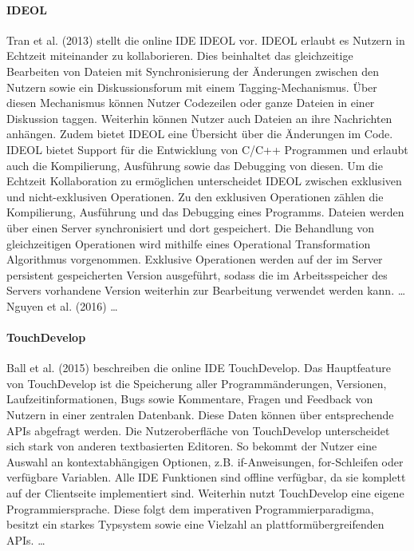 \paragraph{IDEOL}
Tran et al. (2013) \cite{tran_interactive_2013} stellt die online IDE IDEOL vor. IDEOL erlaubt es Nutzern in Echtzeit miteinander zu kollaborieren. Dies beinhaltet das gleichzeitige Bearbeiten von Dateien mit Synchronisierung der Änderungen zwischen den Nutzern sowie ein Diskussionsforum mit einem Tagging-Mechanismus. Über diesen Mechanismus können Nutzer Codezeilen oder ganze Dateien in einer Diskussion taggen. Weiterhin können Nutzer auch Dateien an ihre Nachrichten anhängen. Zudem bietet IDEOL eine Übersicht über die Änderungen im Code. IDEOL bietet Support für die Entwicklung von C/C++ Programmen und erlaubt auch die Kompilierung, Ausführung sowie das Debugging von diesen. Um die Echtzeit Kollaboration zu ermöglichen unterscheidet IDEOL zwischen exklusiven und nicht-exklusiven Operationen. Zu den exklusiven Operationen zählen die Kompilierung, Ausführung und das Debugging eines Programms. Dateien werden über einen Server synchronisiert und dort gespeichert. Die Behandlung von gleichzeitigen Operationen wird mithilfe eines Operational Transformation Algorithmus  vorgenommen. Exklusive Operationen werden auf der im Server persistent gespeicherten Version ausgeführt, sodass die im Arbeitsspeicher des Servers vorhandene Version weiterhin zur Bearbeitung verwendet werden kann. \dots \\
Nguyen et al. (2016) \cite{nguyen_enhancing_2016} \dots {}

\paragraph{TouchDevelop}
Ball et al. (2015) \cite{ball_beyond_2015} beschreiben die online IDE TouchDevelop. Das Hauptfeature von TouchDevelop ist die Speicherung aller Programmänderungen, Versionen, Laufzeitinformationen, Bugs sowie Kommentare, Fragen und Feedback von Nutzern in einer zentralen Datenbank. Diese Daten können über entsprechende APIs abgefragt werden. Die Nutzeroberfläche von TouchDevelop unterscheidet sich stark von anderen textbasierten Editoren. So bekommt der Nutzer eine Auswahl an kontextabhängigen Optionen, z.B. if-Anweisungen, for-Schleifen oder verfügbare Variablen. Alle IDE Funktionen sind offline verfügbar, da sie komplett auf der Clientseite implementiert sind. Weiterhin nutzt TouchDevelop eine eigene Programmiersprache. Diese folgt dem imperativen Programmierparadigma, besitzt ein starkes Typsystem sowie eine Vielzahl an plattformübergreifenden APIs. \dots {}


